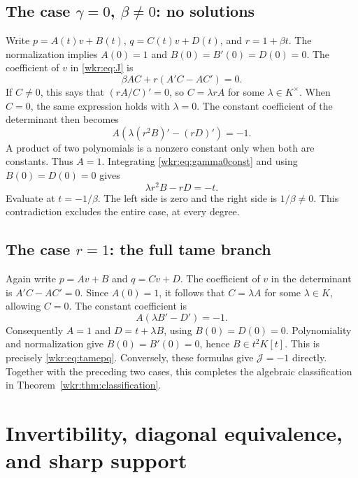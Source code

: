 \documentclass[11pt,a4paper]{article}
\numberwithin{equation}{section}
\theoremstyle{definition}
\theoremstyle{remark}
\newcommand{\J}{\mathcal{J}}
\begin{document}
\subsection{\texorpdfstring{The case $\gamma=0$, $\beta\ne0$: no solutions}{The case gamma zero, beta nonzero: no solutions}}

Write $p=A(t)v+B(t)$, $q=C(t)v+D(t)$, and $r=1+\beta t$. The normalization
implies $A(0)=1$ and $B(0)=B'(0)=D(0)=0$. The coefficient of $v$ in
\eqref{wkr:eq:J} is
\begin{equation}\label{wkr:eq:gamma0v}
\beta AC+r(A'C-AC')=0.
\end{equation}
If $C\ne0$, this says that $(rA/C)'=0$, so $C=\lambda rA$ for some
$\lambda\in K^\times$. When $C=0$, the same expression holds with
$\lambda=0$. The constant coefficient of the determinant then becomes
\begin{equation}\label{wkr:eq:gamma0const}
A\left(\lambda(r^2B)'-(rD)'\right)=-1.
\end{equation}
A product of two polynomials is a nonzero constant only when both are
constants. Thus $A=1$. Integrating \eqref{wkr:eq:gamma0const} and using
$B(0)=D(0)=0$ gives
\begin{equation}\label{wkr:eq:impossible}
\lambda r^2B-rD=-t.
\end{equation}
Evaluate at $t=-1/\beta$. The left side is zero and the right side is
$1/\beta\ne0$. This contradiction excludes the entire case, at every degree.

\subsection{\texorpdfstring{The case $r=1$: the full tame branch}{The case r=1: the full tame branch}}

Again write $p=Av+B$ and $q=Cv+D$. The coefficient of $v$ in the determinant
is $A'C-AC'=0$. Since $A(0)=1$, it follows that $C=\lambda A$ for some
$\lambda\in K$, allowing $C=0$. The constant coefficient is
\[
A(\lambda B'-D')=-1.
\]
Consequently $A=1$ and $D=t+\lambda B$, using $B(0)=D(0)=0$.
Polynomiality and normalization give $B(0)=B'(0)=0$, hence $B\in t^2K[t]$.
This is precisely \eqref{wkr:eq:tamepq}. Conversely, these formulas give
$\J=-1$ directly. Together with the preceding two cases, this completes
the algebraic classification in Theorem~\ref{wkr:thm:classification}.

\section{Invertibility, diagonal equivalence, and sharp support}
\label{wkr:sec:consequences}
\end{document}
